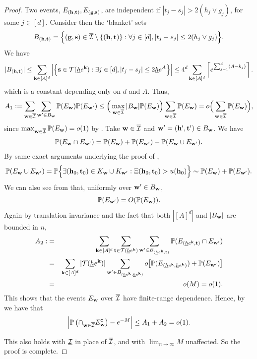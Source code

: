 \documentclass[twoside,11pt]{article}
\begin{document}
\begin{proof}
Two events, $E_{(\mathbf{h},\mathbf{t})}, E_{(\mathbf{g},\mathbf{s})}$, are independent if $|t_j - s_j| > 2 (h_j \vee g_j)$, for some $j \in [d]$.
Consider then the `blanket' sets 
\[B_{(\mathbf{h},\mathbf{t})} = \Big\{ (\mathbf{g},\mathbf{s}) \in \overline {\mathcal{I}} \setminus \{(\mathbf{h}, \mathbf{t})\} : \forall j \in [d], |t_j - s_j| \le 2 (h_j \vee g_j) \Big\}.\]  
We have
\[
|B_{(\mathbf{h},\mathbf{t})}| \le \sum_{\mathbf{k} \in [A]^d} \Big|\Big\{ \mathbf{s} \in {\mathcal{T}}(\underline h e^{\mathbf{k}}) : \exists j \in [d], |t_j -  s_j| \le 2 \underline h e^A  \Big\}\Big| \le 4^d \sum_{\mathbf{k} \in [A]^d} \left\lceil e^{\sum_{j=1}^d (A - k_j)} \right\rceil.
\]
which is a constant depending only on $d$ and $A$.  Thus,
\[
A_1 := \sum_{\mathbf{w} \in \overline {\mathcal{I}}} \sum_{\mathbf{w}' \in B_{\mathbf{w}}} \mathbb{P} (E_{\mathbf{w}}) \mathbb{P}(E_{\mathbf{w}'}) \le \Big( \max_{\mathbf{w} \in \overline {\mathcal{I}}} |B_{\mathbf{w}}| \mathbb{P}(E_{\mathbf{w}}) \Big) \sum_{\mathbf{w} \in \overline {\mathcal{I}}} \mathbb{P} (E_{\mathbf{w}}) = o\Big( \sum_{\mathbf{w} \in \overline {\mathcal{I}}} \mathbb{P} (E_{\mathbf{w}}) \Big),
\]
since $\max_{\mathbf{w} \in \overline {\mathcal{I}}} \mathbb{P}(E_{\mathbf{w}}) = o(1)$ by .
Take $\mathbf{w} \in \overline {\mathcal{I}}$ and $\mathbf{w}' = (\mathbf{h}',\mathbf{t}') \in B_{\mathbf{w}}$. We have
\[
\mathbb{P} ( E_{\mathbf{w}} \cap E_{\mathbf{w}'} ) = \mathbb{P} (E_{\mathbf{w}}) + \mathbb{P}(E_{\mathbf{w}'}) - \mathbb{P} (E_{\mathbf{w}} \cup E_{\mathbf{w}'}). 
\]
By same exact arguments underlying the proof of ,
\[
\mathbb{P} (E_{\mathbf{w}} \cup E_{\mathbf{w}'}) = \mathbb{P} \Big\{ \exists (\mathbf{h}_0,\mathbf{t}_0) \in K_{\mathbf{w}} \cup K_{\mathbf{w}'} : \Xi(\mathbf{h}_0,\mathbf{t}_0) > u(\mathbf{h}_0) \Big\} \sim \mathbb{P} (E_{\mathbf{w}}) + \mathbb{P} (E_{\mathbf{w}'}).
\]
We can also see from  that, uniformly over $\mathbf{w}' \in B_{\mathbf{w}}$,
\[
\mathbb{P} (E_{\mathbf{w}'}) = O( \mathbb{P} (E_{\mathbf{w}}) ).
\]
Again by translation invariance and the fact that both $|[A]^d|$ and $|B_{\mathbf{w}}|$ are bounded in $n$,
\begin{eqnarray*}
A_2:&= &\sum_{\mathbf{k} \in [A]^d} \sum_{\mathbf{t} \in {\mathcal{T}}(\underline h e^{\mathbf{k}})} \sum_{\mathbf{w}' \in B_{(\underline h e^{\mathbf{k}}, \mathbf{t})}} \mathbb{P} ( E_{(\underline h e^{\mathbf{k}},\mathbf{t})} \cap E_{\mathbf{w}'} ) \\
&=& \sum_{\mathbf{k} \in [A]^d} |{\mathcal{T}}(\underline h e^{\mathbf{k}})|  \sum_{\mathbf{w}' \in B_{(\underline h e^{\mathbf{k}}, \underline h e^{\mathbf{k}})}} o\big[\mathbb{P} ( E_{(\underline h e^{\mathbf{k}}, \underline h e^{\mathbf{k}})}) + \mathbb{P} (E_{\mathbf{w}'})\big] \\
&=& o(M) = o(1).
\end{eqnarray*}
This shows that the events $E_{\mathbf{w}}$ over $\overline {\mathcal{I}}$ have finite-range dependence.
Hence, by \citep[Th 1]{arratia1989two} we have that
\[
\Big| \mathbb{P} \left( \cap_{\mathbf{w} \in \overline {\mathcal{I}}} E_{\mathbf{w}}^{\mathsf{c}} \right) - e^{-M} \Big| \le A_1 + A_2 = o(1).
\]

This also holds with $\underline {\mathcal{I}}$ in place of $\overline {\mathcal{I}}$, and with $\lim_{n \rightarrow \infty}M$ unaffected.  So the proof is complete.
\end{proof}
\end{document}
